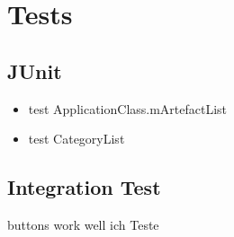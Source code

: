 \newpage
\chapter{Tests}\label{cap:Tests}

\section{JUnit}
\begin{itemize}
\item test ApplicationClass.mArtefactList
\item test CategoryList 
\end{itemize}

\section{Integration Test}
buttons work well
ich Teste
